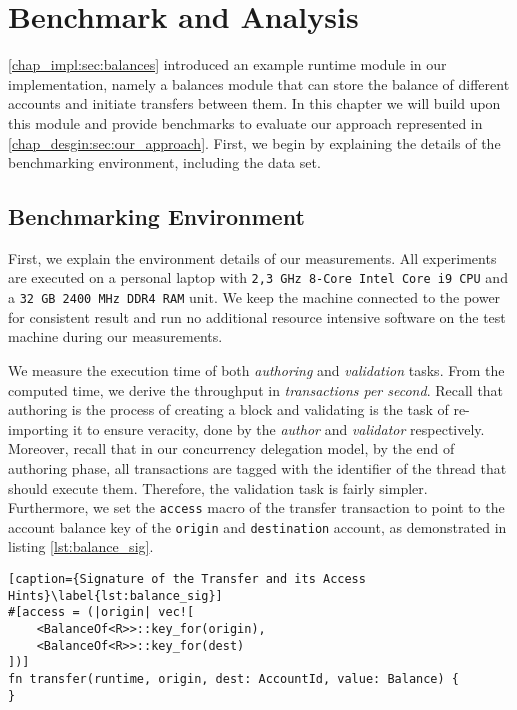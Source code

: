 \chapter{Benchmark and Analysis}  \label{chap:bench_analysis}



\ref{chap_impl:sec:balances} introduced an example runtime module in our implementation, namely a
balances module that can store the balance of different accounts and initiate transfers between
them. In this chapter we will build upon this module and provide benchmarks to evaluate our approach
represented in \ref{chap_desgin:sec:our_approach}. First, we begin by explaining the details of the
benchmarking environment, including the data set.

\section{Benchmarking Environment}

First, we explain the environment details of our measurements. All experiments are executed on a
personal laptop with \texttt{2,3 GHz 8-Core Intel Core i9 CPU} and a \texttt{32 GB 2400 MHz DDR4
RAM} unit. We keep the machine connected to the power for consistent result and run no additional
resource intensive software on the test machine during our measurements.

We measure the execution time of both \textit{authoring} and \textit{validation} tasks. From the
computed time, we derive the throughput in \textit{transactions per second}. Recall that authoring
is the process of creating a block and validating is the task of re-importing it to ensure veracity,
done by the \textit{author} and \textit{validator} respectively. Moreover, recall that in our
concurrency delegation model, by the end of authoring phase, all transactions are tagged with the
identifier of the thread that should execute them. Therefore, the validation task is fairly simpler.
Furthermore, we set the \texttt{access} macro of the transfer transaction to point to the account
balance key of the \texttt{origin} and \texttt{destination} account, as demonstrated in listing
\ref{lst:balance_sig}.

\begin{lstlisting}[caption={Signature of the Transfer and its Access Hints}\label{lst:balance_sig}]
#[access = (|origin| vec![
	<BalanceOf<R>>::key_for(origin),
	<BalanceOf<R>>::key_for(dest)
])]
fn transfer(runtime, origin, dest: AccountId, value: Balance) {
}
\end{lstlisting}

